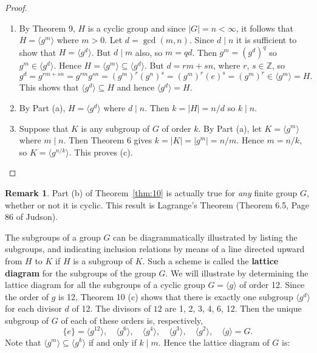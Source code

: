 \documentclass[11pt]{article}
\newcommand{\Z} {{\mathbb Z}}
\newcommand{\divides}{\ensuremath{\mid}}
\newcommand{\<}{\ensuremath{\langle}}
\renewcommand{\>}{\ensuremath{\rangle}}
\newcommand{\eye}{\ensuremath{e}}
\theoremstyle{plain}
\theoremstyle{definition}
\newtheorem{rem}[thm]{Remark}
\begin{document}
\begin{proof} \begin{enumerate}
\item By Theorem 9, $H$ is a cyclic group and since $|G|=n<\infty$,
it follows that $H=\langle g^m\rangle$ where $m>0$.  Let
$d=\gcd(m, n)$.  Since $d\divides n$ it is sufficient to show that
$H=\langle g^d\rangle$.  But $d\divides m$ also, so $m=qd$.  Then
$g^m=(g^d)^q$ so $g^m\in \langle g^d\rangle$.  Hence $H=\langle
g^m\rangle \subseteq \langle g^d\rangle$.  But $d=rm+ sn$, where
$r$, $s\in \Z$, so
$$g^d=g^{rm+sn}=g^{rm}g^{sn}=(g^m)^r(g^n)^s=(g^m)^r(\eye)^s=
(g^m)^r\in\langle g^m\rangle = H.$$
This shows that $\langle g^d \rangle \subseteq H$ and  hence
$\langle g^d\rangle = H$.

\item By Part (a), $H=\langle g^d\rangle$ where $d\divides n$.  Then $k=|H|=
n/d$ so $k\divides n$.

\item Suppose that $K$ is any subgroup of $G$ of order $k$.  By
Part (a), let $K=\langle g^m\rangle$ where $m\divides n$.  Then
Theorem 6 gives $k=|K| = |g^m| = n/m$.  Hence $m=n/k$, so
$K=\langle g^{n/k}\rangle$.  This proves (c).
\end{enumerate}
\end{proof}

\begin{rem} Part (b) of Theorem~\ref{thm:10} is actually true for {\it any} finite
group $G$, whether or not it is cyclic.  This result is Lagrange's
Theorem (Theorem 6.5, Page 86 of Judson).
\end{rem}


The subgroups of a group $G$ can be diagrammatically  illustrated
by listing the subgroups, and indicating inclusion relations by
means of a line directed upward from $H$ to $K$ if $H$ is a
subgroup of $K$.  Such a scheme is called the {\bf lattice
diagram} for the subgroups of the group $G$.  We will illustrate
by determining the lattice diagram for all the subgroups of a
cyclic group $G=\langle g\rangle$ of order 12.  Since the order of
$g$ is 12, Theorem 10 (c) shows that there is exactly one subgroup
$\langle g^d\rangle$ for each divisor $d$ of 12.  The divisors of
$12$ are 1, 2, 3, 4, 6, 12.  Then the unique subgroup of $G$ of
each of these orders is, respectively,
\[
\{\eye\}=\langle g^{12}\rangle,\quad \langle g^6\rangle, \quad
\langle g^4\rangle,\quad \langle g^3\rangle, \quad \langle
g^2\rangle , \quad \langle g\rangle = G.
\]
Note that $\langle
g^m\rangle \subseteq \langle g^k\rangle$ if and only if $k\divides m$.
Hence the lattice diagram of $G$ is:
\end{document}
